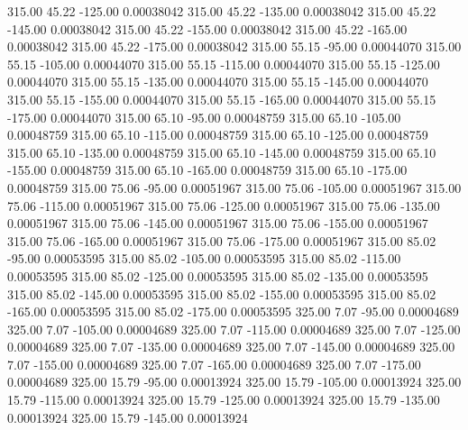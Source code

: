     315.00     45.22   -125.00     0.00038042
    315.00     45.22   -135.00     0.00038042
    315.00     45.22   -145.00     0.00038042
    315.00     45.22   -155.00     0.00038042
    315.00     45.22   -165.00     0.00038042
    315.00     45.22   -175.00     0.00038042
    315.00     55.15    -95.00     0.00044070
    315.00     55.15   -105.00     0.00044070
    315.00     55.15   -115.00     0.00044070
    315.00     55.15   -125.00     0.00044070
    315.00     55.15   -135.00     0.00044070
    315.00     55.15   -145.00     0.00044070
    315.00     55.15   -155.00     0.00044070
    315.00     55.15   -165.00     0.00044070
    315.00     55.15   -175.00     0.00044070
    315.00     65.10    -95.00     0.00048759
    315.00     65.10   -105.00     0.00048759
    315.00     65.10   -115.00     0.00048759
    315.00     65.10   -125.00     0.00048759
    315.00     65.10   -135.00     0.00048759
    315.00     65.10   -145.00     0.00048759
    315.00     65.10   -155.00     0.00048759
    315.00     65.10   -165.00     0.00048759
    315.00     65.10   -175.00     0.00048759
    315.00     75.06    -95.00     0.00051967
    315.00     75.06   -105.00     0.00051967
    315.00     75.06   -115.00     0.00051967
    315.00     75.06   -125.00     0.00051967
    315.00     75.06   -135.00     0.00051967
    315.00     75.06   -145.00     0.00051967
    315.00     75.06   -155.00     0.00051967
    315.00     75.06   -165.00     0.00051967
    315.00     75.06   -175.00     0.00051967
    315.00     85.02    -95.00     0.00053595
    315.00     85.02   -105.00     0.00053595
    315.00     85.02   -115.00     0.00053595
    315.00     85.02   -125.00     0.00053595
    315.00     85.02   -135.00     0.00053595
    315.00     85.02   -145.00     0.00053595
    315.00     85.02   -155.00     0.00053595
    315.00     85.02   -165.00     0.00053595
    315.00     85.02   -175.00     0.00053595
    325.00      7.07    -95.00     0.00004689
    325.00      7.07   -105.00     0.00004689
    325.00      7.07   -115.00     0.00004689
    325.00      7.07   -125.00     0.00004689
    325.00      7.07   -135.00     0.00004689
    325.00      7.07   -145.00     0.00004689
    325.00      7.07   -155.00     0.00004689
    325.00      7.07   -165.00     0.00004689
    325.00      7.07   -175.00     0.00004689
    325.00     15.79    -95.00     0.00013924
    325.00     15.79   -105.00     0.00013924
    325.00     15.79   -115.00     0.00013924
    325.00     15.79   -125.00     0.00013924
    325.00     15.79   -135.00     0.00013924
    325.00     15.79   -145.00     0.00013924
